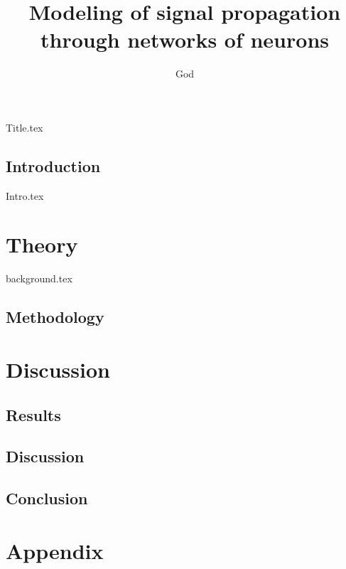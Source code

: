 \documentclass[11pt]{_NoTouch/_MyProject}
\title{Modeling of signal propagation through networks of neurons}
\author{God}
\begin{document}

{Title.tex}
\tableofcontents








\newpage
{}
\chapter*{Introduction} 
{Intro.tex}

\part{Theory}

{background.tex}

\newpage
\chapter{Methodology}


\newpage
\part{Discussion}
\chapter{Results}


\newpage
\chapter{Discussion}

\newpage
\chapter{Conclusion}


\appendix
\part{Appendix}
\end{document}
